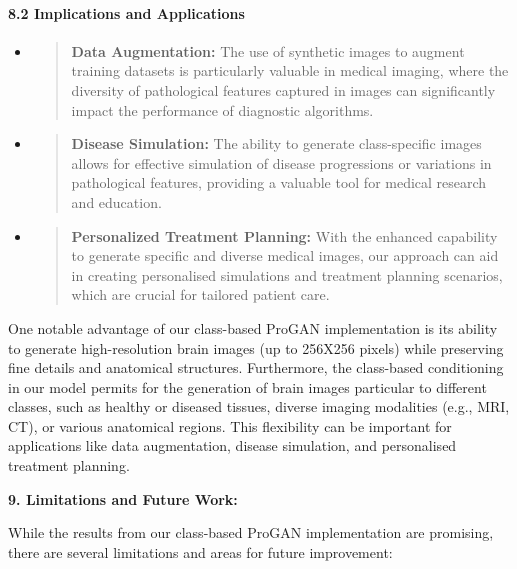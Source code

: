 \documentclass[
]{article}
\begin{document}
\hypertarget{implications-and-applications}{%
\paragraph{\texorpdfstring{\textbf{8.2 Implications and
Applications}}{8.2 Implications and Applications}}\label{implications-and-applications}}

\begin{itemize}
\item
  \begin{quote}
  \textbf{Data Augmentation:} The use of synthetic images to augment
  training datasets is particularly valuable in medical imaging, where
  the diversity of pathological features captured in images can
  significantly impact the performance of diagnostic algorithms.
  \end{quote}
\item
  \begin{quote}
  \textbf{Disease Simulation:} The ability to generate class-specific
  images allows for effective simulation of disease progressions or
  variations in pathological features, providing a valuable tool for
  medical research and education.
  \end{quote}
\item
  \begin{quote}
  \textbf{Personalized Treatment Planning:} With the enhanced capability
  to generate specific and diverse medical images, our approach can aid
  in creating personalised simulations and treatment planning scenarios,
  which are crucial for tailored patient care.
  \end{quote}
\end{itemize}

One notable advantage of our class-based ProGAN implementation is its
ability to generate high-resolution brain images (up to 256X256 pixels)
while preserving fine details and anatomical structures. Furthermore,
the class-based conditioning in our model permits for the generation of
brain images particular to different classes, such as healthy or
diseased tissues, diverse imaging modalities (e.g., MRI, CT), or various
anatomical regions. This flexibility can be important for applications
like data augmentation, disease simulation, and personalised treatment
planning.

\textbf{9. Limitations and Future Work:}

While the results from our class-based ProGAN implementation are
promising, there are several limitations and areas for future
improvement:
\end{document}

